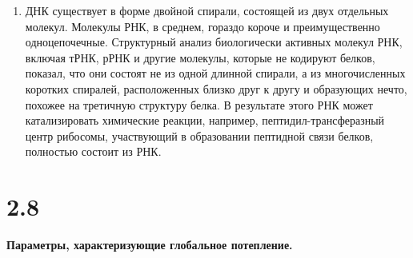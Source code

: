 \documentclass[a4paper,14pt]{article}
\begin{document}
\begin{enumerate}
\item ДНК существует в форме двойной спирали, состоящей из двух отдельных молекул. Молекулы РНК, в среднем, гораздо короче и преимущественно одноцепочечные. Структурный анализ биологически активных молекул РНК, включая тРНК, рРНК и другие молекулы, которые не кодируют белков, показал, что они состоят не из одной длинной спирали, а из многочисленных коротких спиралей, расположенных близко друг к другу и образующих нечто, похожее на третичную структуру белка. В результате этого РНК может катализировать химические реакции, например, пептидил-трансферазный центр рибосомы, участвующий в образовании пептидной связи белков, полностью состоит из РНК.
\end{enumerate}

\section*{2.8}

\begin{center}
	\LARGE{\textbf{Параметры, характеризующие глобальное потепление.}}\\
\end{center}
\end{document}
